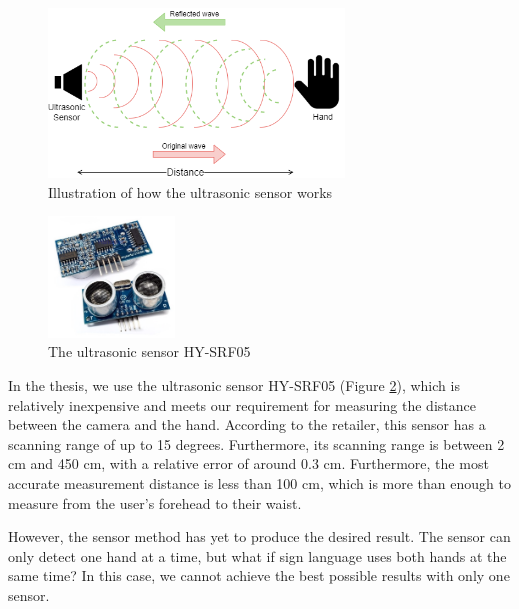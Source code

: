 \begin{figure}[H]
	\centering
	\includegraphics[width=0.7\textwidth]{img/Chap4/UltrasonicSensorFunction.png}
	\caption{Illustration of how the ultrasonic sensor works}
	\label{fig:Chap4-UltrasonicSensorFunction}
\end{figure}

\begin{figure}
  \begin{center}
  	\includegraphics[width=0.3\textwidth]{img/Chap4/UltrasonicSensor.jpeg}
  \end{center}
	\caption{The ultrasonic sensor HY-SRF05}
  \label{fig:Chap4-UltrasonicSensorHYSRF05}
\end{figure}

In the thesis, we use the ultrasonic sensor HY-SRF05 (Figure \ref{fig:Chap4-UltrasonicSensorHYSRF05}), which is relatively inexpensive and meets our requirement for measuring the distance between the camera and the hand. According to the retailer, this sensor has a scanning range of up to 15 degrees. Furthermore, its scanning range is between 2 cm and 450 cm, with a relative error of around 0.3 cm. Furthermore, the most accurate measurement distance is less than 100 cm, which is more than enough to measure from the user's forehead to their waist.

However, the sensor method has yet to produce the desired result. The sensor can only detect one hand at a time, but what if sign language uses both hands at the same time? In this case, we cannot achieve the best possible results with only one sensor.

